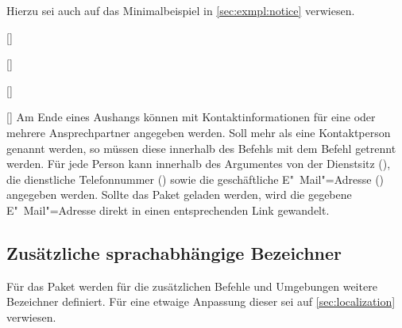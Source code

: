 \begin{Bundle*}{}
\begin{Example}
\begin{Code}[escapechar=§]
{  Bild (optional), einzubinden mit:
    \texttt{[image: §\\PName\{Datei]}§}
}{%
  \item Schwerpunkt 1
  \item Schwerpunkt 2
}
\end{Code}
Hierzu sei auch auf das Minimalbeispiel in \autoref{sec:exmpl:notice} verwiesen.
%
\end{Example}

\begin{Declaration}[v2.02]{[]}
\begin{Declaration}{[]}
\begin{Declaration}[v2.02]{[]}
\begin{Declaration}[v2.02]{[]}
\printdeclarationlist%
%
Am Ende eines Aushangs können mit  Kontaktinformationen 
für eine oder mehrere Ansprechpartner angegeben werden. Soll mehr als eine 
Kontaktperson genannt werden, so müssen diese innerhalb des Befehls
 mit dem Befehl  getrennt werden. Für jede 
Person kann innerhalb des Argumentes von  der Dienstsitz 
(), die dienstliche Telefonnummer () sowie die 
geschäftliche E"~Mail"=Adresse () angegeben werden. Sollte 
das Paket  geladen werden, wird die gegebene E"~Mail"=Adresse 
direkt in einen entsprechenden Link gewandelt.
\end{Declaration}
\end{Declaration}
\end{Declaration}
\end{Declaration}


\subsection{Zusätzliche sprachabhängige Bezeichner}
%
%
Für das Paket  werden für die zusätzlichen Befehle 
und Umgebungen weitere Bezeichner definiert. Für eine etwaige Anpassung dieser 
sei auf \autoref{sec:localization} verwiesen.


\end{Bundle*}
